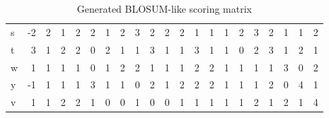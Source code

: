 \documentclass[a4paper,11pt]{article}
\begin{document}
\begin{table}[!hbp]
\begin{tabular}{l|*{20}{r} }
		s & -2 & 2  & 1 & 2 & 2 & 1  & 2  & 3  & 2 & 2  & 2  & 1  & 1  & 1  & 2  & 3  & 2 & 1 & 1  & 2 \\
		t & 3  & 1  & 2 & 2 & 0 & 2  & 1  & 1  & 3 & 1  & 1  & 3  & 1  & 1  & 0  & 2  & 3 & 1 & 2  & 1 \\
		w & 1  & 1  & 1 & 1 & 0 & 1  & 2  & 2  & 1 & 1  & 1  & 2  & 2  & 1  & 1  & 1  & 1 & 3 & 0  & 2 \\
		y & -1 & 1  & 1 & 1 & 3 & 1  & 1  & 0  & 2 & 1  & 2  & 2  & 2  & 1  & 1  & 1  & 2 & 0 & 4  & 1 \\
		v & 1  & 1  & 2 & 2 & 1 & 0  & 0  & 1  & 0 & 0  & 1  & 1  & 1  & 1  & 1  & 2  & 1 & 2 & 1  & 4\\
		\hline
	\end{tabular}
	\caption{Generated BLOSUM-like scoring matrix}
    \label{substitutions}
\end{table}
\end{document}
